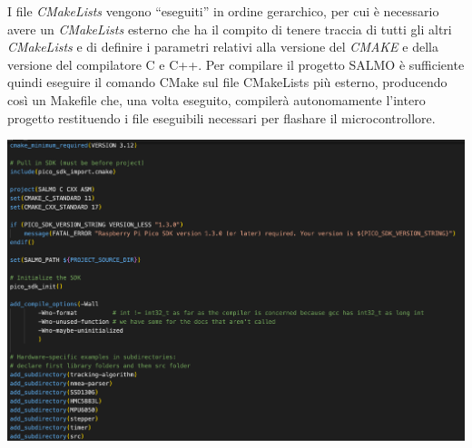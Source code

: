 \noindent I file \textit{CMakeLists} vengono ``eseguiti'' in ordine gerarchico, per cui è
necessario avere un \textit{CMakeLists} esterno che ha il compito di tenere
traccia di tutti gli altri \emph{CMakeLists} e di definire i parametri
relativi alla versione del \emph{CMAKE} e della versione del compilatore
C e C++. Per compilare il progetto SALMO è sufficiente quindi eseguire
il comando CMake sul file CMakeLists più esterno, producendo così un
Makefile che, una volta eseguito, compilerà autonomamente l'intero
progetto restituendo i file eseguibili necessari per flashare il
microcontrollore.

\begin{center}
\includegraphics[scale=0.55]{figures/image67.png}
\captionsetup{type=figure}
\end{center}


